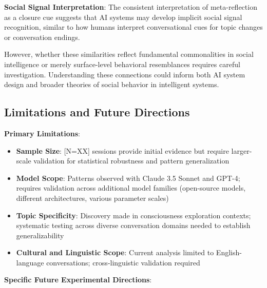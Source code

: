 \documentclass[11pt,letterpaper]{article}
\newcommand{\totalSessions}{[N=XX]} %
\begin{document}
\textbf{Social Signal Interpretation}: The consistent interpretation of meta-reflection as a closure cue suggests that AI systems may develop implicit social signal recognition, similar to how humans interpret conversational cues for topic changes or conversation endings.

However, whether these similarities reflect fundamental commonalities in social intelligence or merely surface-level behavioral resemblances requires careful investigation. Understanding these connections could inform both AI system design and broader theories of social behavior in intelligent systems.

\subsection{Limitations and Future Directions}

\textbf{Primary Limitations}:

\begin{itemize}
    \item \textbf{Sample Size}: \totalSessions{} sessions provide initial evidence but require larger-scale validation for statistical robustness and pattern generalization
    \item \textbf{Model Scope}: Patterns observed with Claude 3.5 Sonnet and GPT-4; requires validation across additional model families (open-source models, different architectures, various parameter scales)
    \item \textbf{Topic Specificity}: Discovery made in consciousness exploration contexts; systematic testing across diverse conversation domains needed to establish generalizability
    \item \textbf{Cultural and Linguistic Scope}: Current analysis limited to English-language conversations; cross-linguistic validation required
\end{itemize}

\textbf{Specific Future Experimental Directions}:
\end{document}

